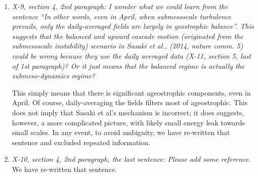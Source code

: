 \documentclass[11pt]{article}
\newcommand{\bdp}{\begin{description}}
\newcommand{\edp}{\end{description}}
\begin{document}
\begin{enumerate}
  \item {\it X-9, section 4, 2nd paragraph: I wonder what we could learn from the sentence “In
          other words, even in April, when submesoscale turbulence prevails, only the
          daily-averaged fields are largely in geostrophic balance”. This suggests that the
          balanced and upward cascade motion (originated from the submesoscale
          instability) scenario in Sasaki et al., (2014, nature comm. 5) could be wrong
          because they use the daily averaged data (X-11, section 5, last of 1st paragraph)?
          Or it just means that the balanced regime is actually the submeso-dynamics
          regime?}\\

          \bdp
              This simply means that there is significant ageostrophic components,
              even in April. Of course, daily-averaging the fields filters most of
              ageostrophic. This does not imply that Sasaki et al's mechanism is
              incorrect; it does suggests, however, a more complicated picture, with
              likely small energy leak towards small scales. In any event, to avoid ambiguity, we
              have re-written that sentence and excluded repeated information.
          \edp

  \item {\it X-10, section 4, 2nd paragraph, the last sentence: Please add some reference.}\\
          We have re-written that sentence.
\end{enumerate}
\end{document}
